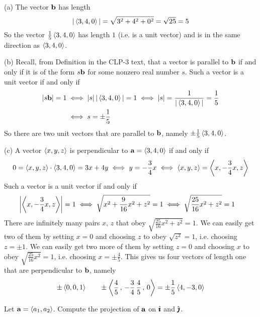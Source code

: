\begin{solution}
(a) The vector $\mathbf{b}$ has length
\begin{equation*}
|\left< 3,4,0 \right>|
=\sqrt{3^2+4^2+0^2}
=\sqrt{25}
=5
\end{equation*}
So the vector $\frac{1}{5}\left< 3,4,0 \right>$ has length $1$ (i.e. is a 
unit vector) and is in the same direction as  $\left< 3,4,0 \right>$.

(b) Recall, from Definition  in the CLP-3 text, that a vector is parallel to $\mathbf{b}$ if and only if it is of the form $s\mathbf{b}$
for some nonzero real number $s$. Such a vector is a unit vector if and only if
\begin{align*}
|s\mathbf{b}|=1
&\iff |s|\,|\left< 3,4,0 \right>|=1
\iff |s| = \frac{1}{|\left< 3,4,0 \right>|}= \frac{1}{5} \\
&\iff s  = \pm \frac{1}{5}
\end{align*}
So there are two unit vectors that are parallel to $\mathbf{b}$, namely
$\pm\frac{1}{5}\left< 3,4,0 \right>$.

(c) A vector $\left< x,y,z \right>$ is perpendicular to $\mathbf{a}=\left< 3,4,0\right>$
if and only if
\begin{equation*}
0=\left< x,y,z \right>\cdot\left< 3,4,0\right>
 = 3x+4y
\iff y=-\frac{3}{4}x
\iff \left< x,y,z \right> = \left< x,-\frac{3}{4}x,z \right> 
\end{equation*}
 Such a vector is a unit vector if and only if
\begin{align*}
 \left|\left< x,-\frac{3}{4}x,z \right>\right|=1
&\iff \sqrt{x^2+\frac{9}{16}x^2+z^2}=1
 \iff \sqrt{\frac{25}{16}x^2+z^2}=1
\end{align*}
There are infinitely many pairs $x$, $z$ that 
obey $\sqrt{\frac{25}{16}x^2+z^2}=1$. We can easily get two of them
by setting $x=0$ and choosing $z$ to obey $\sqrt{z^2}=1$, i.e. choosing 
$z=\pm 1$. We can easily get two more of them
by setting $z=0$ and choosing $x$ to obey $\sqrt{\frac{25}{16}x^2}=1$, 
i.e. choosing $x=\pm \frac{4}{5}$. This gives us four vectors of length one that
are perpendicular to $\mathbf{b}$, namely
\begin{equation*}
\pm\left< 0,0,1\right>\qquad
\pm\left< \frac{4}{5}\,,\,-\frac{3}{4}\,\frac{4}{5}\,,\,0\right>
=\pm\frac{1}{5}\left< 4,-3,0\right>
\end{equation*}

\end{solution}



\begin{question}
Let $\mathbf{a}=\left< a_1,a_2\right>$. Compute the projection of $\mathbf{a}$ on
$\hat{\pmb{\imath}}$ and $\hat{\pmb{\jmath}}$.
\end{question}

